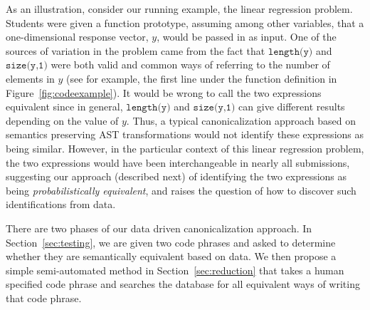 \begin{example}\label{ex:lengthy}
 As an illustration, consider our running example, the linear regression problem. 
Students were given a function prototype, assuming among other variables,  
that a one-dimensional response vector, $y$, would be passed in as input.
One of the sources of variation in the  problem came from the fact that
$\texttt{length(y)}$ and $\texttt{size(y,1)}$ were both valid and common ways of referring to the number of
elements in $y$ (see for example, the first line under the function definition in Figure~\ref{fig:codeexample}).  
It would be wrong to call the two expressions equivalent since
in general, $\texttt{length(y)}$ and $\texttt{size(y,1)}$ can give different results depending on the value of $y$.
Thus, a typical canonicalization approach based on semantics preserving AST transformations would not identify these expressions as being similar.
However, in the particular context of this linear regression problem, the two expressions would have been interchangeable
in nearly all submissions, suggesting our approach (described next) of identifying the two expressions as
being \emph{probabilistically equivalent}, and raises the question of how to discover such identifications from data.
\end{example}

There are two phases of our data driven canonicalization approach. In Section~\ref{sec:testing}, we are given 
two code phrases and asked to determine whether they are semantically equivalent based on data.
We then propose a simple semi-automated method in Section~\ref{sec:reduction} that takes a human specified code phrase and searches the database for all equivalent
ways of writing that code phrase.


